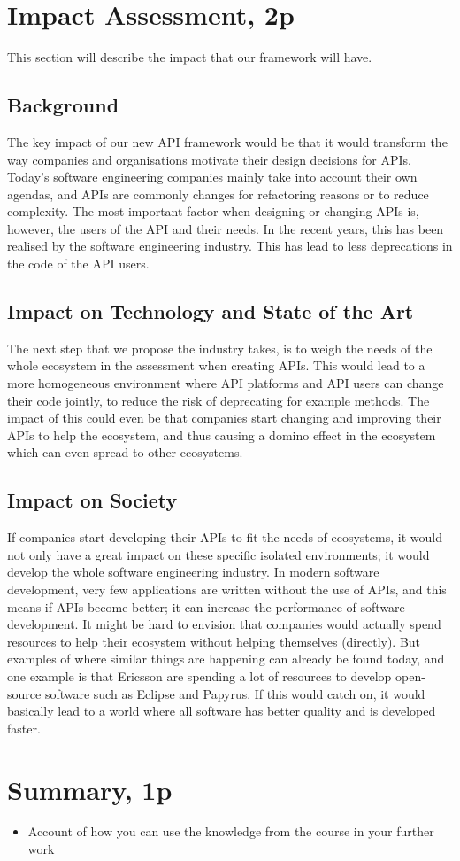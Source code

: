\documentclass{article}
\begin{document}
\section{Impact Assessment, 2p}
This section will describe the impact that our framework will have. 

\subsection{Background}
The key impact of our new API framework would be that it would transform the way companies and organisations motivate their design decisions for APIs. Today's software engineering companies mainly take into account their own agendas, and APIs are commonly changes for refactoring reasons or to reduce complexity. The most important factor when designing or changing APIs is, however, the users of the API and their needs. In the recent years, this has been realised by the software engineering industry. This has lead to less deprecations in the code of the API users. 

\subsection{Impact on Technology and State of the Art}
The next step that we propose the industry takes, is to weigh the needs of the whole ecosystem in the assessment when creating APIs. This would lead to a more homogeneous environment where API platforms and API users can change their code jointly, to reduce the risk of deprecating for example methods. The impact of this could even be that companies start changing and improving their APIs to help the ecosystem, and thus causing a domino effect in the ecosystem which can even spread to other ecosystems. 

\subsection{Impact on Society}
If companies start developing their APIs to fit the needs of ecosystems, it would not only have a great impact on these specific isolated environments; it would develop the whole software engineering industry. In modern software development, very few applications are written without the use of APIs, and this means if APIs become better; it can increase the performance of software development. It might be hard to envision that companies would actually spend resources to help their ecosystem without helping themselves (directly). But examples of where similar things are happening can already be found today, and one example is that Ericsson are spending a lot of resources to develop open-source software such as Eclipse and Papyrus. If this would catch on, it would basically lead to a world where all software has better quality and is developed faster. 

\section{Summary, 1p}

\begin{itemize}
	\item Account of how you can use the knowledge from the course in your further work
\end{itemize}




\end{document}
